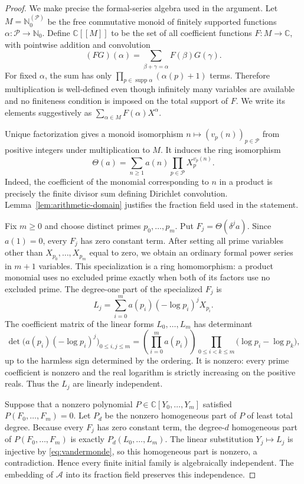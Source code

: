 \documentclass[11pt]{article}
\numberwithin{equation}{section}
\theoremstyle{definition}
\theoremstyle{remark}
\newcommand{\C}{\mathbb C}
\newcommand{\N}{\mathbb N}
\newcommand{\Pp}{\mathcal P}
\newcommand{\A}{\mathcal A}
\begin{document}
\begin{proof}
We make precise the formal-series algebra used in the argument.  Let
$M=\N_0^{(\Pp)}$ be the free commutative monoid of finitely supported functions
$\alpha:\Pp\to\N_0$.  Define $\C[[M]]$ to be the set of all coefficient functions
$F:M\to\C$, with pointwise addition and convolution
\[
 (FG)(\alpha)=\sum_{\beta+\gamma=\alpha}F(\beta)G(\gamma).
\]
For fixed $\alpha$, the sum has only
$\prod_{p\in\operatorname{supp}\alpha}(\alpha(p)+1)$ terms.  Therefore multiplication is
well-defined even though infinitely many variables are available and no finiteness condition is
imposed on the total support of $F$.  We write its elements suggestively as
$\sum_{\alpha\in M}F(\alpha)X^\alpha$.

Unique factorization gives a monoid isomorphism
$n\mapsto(v_p(n))_{p\in\Pp}$ from positive integers under multiplication to $M$.  It induces the
ring isomorphism
\begin{equation}
 \Theta(a)=\sum_{n\geq1}a(n)\prod_{p\in\Pp}X_p^{v_p(n)}.
 \label{eq:arithmetic-series}
\end{equation}
Indeed, the coefficient of the monomial corresponding to $n$ in a product is precisely the
finite divisor sum defining Dirichlet convolution.  Lemma~\ref{lem:arithmetic-domain} justifies
the fraction field used in the statement.

Fix $m\geq0$ and choose distinct primes $p_0,\ldots,p_m$.  Put
$F_j=\Theta(\delta^j a)$.  Since $a(1)=0$, every $F_j$ has zero constant term.  After setting all
prime variables other than $X_{p_0},\ldots,X_{p_m}$ equal to zero, we obtain an ordinary formal
power series in $m+1$ variables.  This specialization is a ring homomorphism: a product monomial
uses no excluded prime exactly when both of its factors use no excluded prime.  The degree-one
part of the specialized $F_j$ is
\begin{equation}
 L_j=\sum_{i=0}^{m}a(p_i)(-\log p_i)^jX_{p_i}.
 \label{eq:linear-prime-part}
\end{equation}
The coefficient matrix of the linear forms $L_0,\ldots,L_m$ has determinant
\begin{equation}
 \det\bigl(a(p_i)(-\log p_i)^j\bigr)_{0\leq i,j\leq m}
 =\left(\prod_{i=0}^{m}a(p_i)\right)
   \prod_{0\leq i<k\leq m}\bigl(\log p_i-\log p_k\bigr),
 \label{eq:vandermonde}
\end{equation}
up to the harmless sign determined by the ordering.  It is nonzero: every prime coefficient is
nonzero and the real logarithm is strictly increasing on the positive reals.  Thus the $L_j$ are
linearly independent.

Suppose that a nonzero polynomial $P\in\C[Y_0,\ldots,Y_m]$ satisfied
$P(F_0,\ldots,F_m)=0$.  Let $P_d$ be the nonzero homogeneous part of $P$ of least total degree.
Because every $F_j$ has zero constant term, the degree-$d$ homogeneous part of
$P(F_0,\ldots,F_m)$ is exactly $P_d(L_0,\ldots,L_m)$.  The linear substitution
$Y_j\mapsto L_j$ is injective by \eqref{eq:vandermonde}, so this homogeneous part is nonzero, a
contradiction.  Hence every finite initial family is algebraically independent.  The embedding of
$\A$ into its fraction field preserves this independence.
\end{proof}
\end{document}
